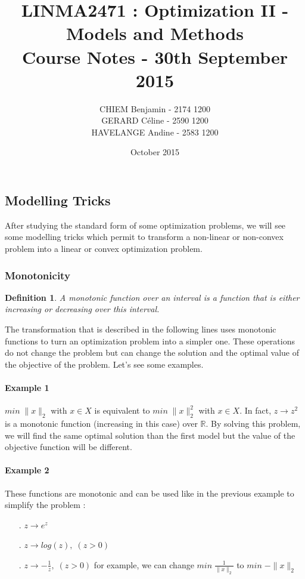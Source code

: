 \documentclass{article}
\title{\textbf{LINMA2471 : Optimization II - Models and Methods \\
Course Notes - 30th September 2015}}
\author{CHIEM Benjamin - 2174 1200\\
GERARD Céline - 2590 1200 \\
HAVELANGE Andine - 2583 1200 }
\date{October 2015}
\begin{document}
\maketitle

\subsection{Modelling Tricks}

After studying the standard form of some optimization problems, we will see some modelling tricks which permit to transform a non-linear or non-convex problem into a linear or convex optimization problem. 

\subsubsection{Monotonicity}

\newtheorem{mydef}{Definition}
\begin{mydef}
A monotonic function over an interval is a function that is either increasing or decreasing over this interval.
\end{mydef}

The transformation that is described in the following lines uses monotonic functions to turn an optimization problem into a simpler one. These operations do not change the problem but can change the solution and the optimal value of the objective of the problem. Let's see some examples. \\ 

\paragraph{Example 1}
$min \; \|x\|_{2}$ with $x \in X$ is equivalent to $min \; \|x\|_{2}^{2}$ with $x \in X$. In fact, $z \rightarrow z^2$ is a monotonic function (increasing in this case) over $\mathbb{R}$. By solving this problem, we will find the same optimal solution than the first model but the value of the objective function will be different. \\

\paragraph{Example 2}
These functions are monotonic and can be used like in the previous example to simplify the problem :
\begin{itemize}
\item[.]{$z \rightarrow e^z$}
\item[.]{$z \rightarrow log(z), \; (z>0)$}
\item[.]{$z \rightarrow -\frac{1}{z}, \; (z>0)$ for example, we can change $min \; \frac{1}{\|x\|_{2}}$ to $min \; -\|x\|_{2}$}\\
\end{itemize}
\end{document}
